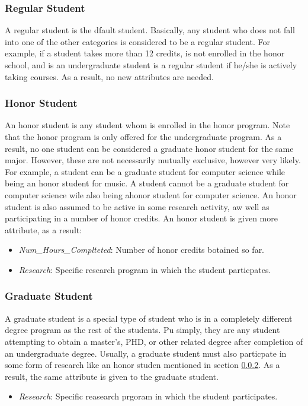 \documentclass{article}
\begin{document}
  \subsubsection{Regular Student}\label{sec:Concept:Student:Regular}
    A regular student is the dfault student.  Basically, any student who does not fall into one of the other categories is considered to be a regular student.  For example, if a student takes more than 12 credits, is not enrolled in the honor school, and is an undergraduate student is a regular student if he/she is actively taking courses.  As a result, no new attributes are needed.

  \subsubsection{Honor Student}\label{sec:Concept:Student:Honor}
    An honor student is any student whom is enrolled in the honor program.  Note that the honor program is only offered for the undergraduate program.  As a result,  no one student can be considered a graduate honor student for the same major.  However, these are not necessarily mutually exclusive, however very likely.  For example, a student can be a graduate student for computer science while being an honor student for music.  A student cannot be a graduate student for computer science wile also being ahonor student for computer science.  An honor student is also assumed to be active in some research activity, aw well as participating in a number of honor credits.  An honor student is given more attribute, as a result:
    \begin{itemize}
      \item \textit{Num\_Hours\_Complteted}: Number of honor credits botained so far.
      \item \textit{Research}: Specific research program in which the student particpates.
    \end{itemize}

  \subsubsection{Graduate Student}\label{sec:Concept:Student:Graduate}
    A graduate student is a special type of student who is in a completely different degree program as the rest of the students.  Pu simply, they are any student attempting to obtain a master's, PHD, or other related degree after completion of an undergraduate degree.  Usually, a graduate student must also particpate in some form of research like an honor studen mentioned in section \ref{sec:Concept:Student:Honor}.  As a result, the same attribute is given to the graduate student.
    \begin{itemize}
      \item \textit{Research}: Specific reasearch prgoram in which the student participates.
    \end{itemize}
\end{document}
